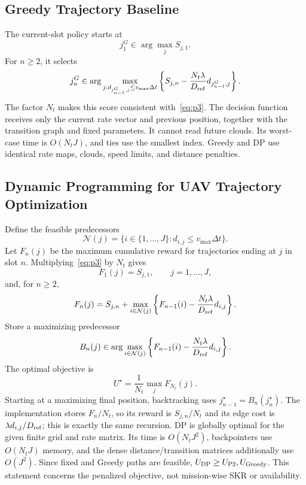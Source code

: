 \subsection{Greedy Trajectory Baseline}
The current-slot policy starts at
\begin{equation}
 j_1^G\in\arg\max_j S_{j,1}.
 \label{eq:greedy_init}
\end{equation}
For $n\ge2$, it selects
\begin{equation}
 j_n^G\in\arg\max_{j:d_{j_{n-1}^G,j}\le v_{\max}\Delta t}
 \left\{S_{j,n}-\frac{N_t\lambda}{D_{\rm ref}}d_{j_{n-1}^G,j}\right\}.
 \label{eq:greedy}
\end{equation}
The factor $N_t$ makes this score consistent with~\eqref{eq:p3}.
The decision function receives only the current rate vector and
previous position, together with the transition graph and fixed
parameters. It cannot read future clouds. Its worst-case time is
$O(N_tJ)$, and ties use the smallest index. Greedy and DP use identical
rate maps, clouds, speed limits, and distance penalties.

\subsection{Dynamic Programming for UAV Trajectory Optimization}
Define the feasible predecessors
\begin{equation}
 \mathcal N(j)=\{i\in\{1,\ldots,J\}:d_{i,j}\le v_{\max}\Delta t\}.
 \label{eq:neighbors}
\end{equation}
Let $F_n(j)$ be the maximum cumulative reward for trajectories ending
at $j$ in slot $n$. Multiplying~\eqref{eq:p3} by $N_t$ gives
\begin{equation}
 F_1(j)=S_{j,1},\qquad j=1,\ldots,J,
 \label{eq:dp_init}
\end{equation}
and, for $n\ge2$,
\begin{equation}
 F_n(j)=S_{j,n}+\max_{i\in\mathcal N(j)}
 \left\{F_{n-1}(i)-\frac{N_t\lambda}{D_{\rm ref}}d_{i,j}\right\}.
 \label{eq:dp}
\end{equation}
Store a maximizing predecessor
\begin{equation}
 B_n(j)\in\arg\max_{i\in\mathcal N(j)}
 \left\{F_{n-1}(i)-\frac{N_t\lambda}{D_{\rm ref}}d_{i,j}\right\}.
 \label{eq:backpointer}
\end{equation}
The optimal objective is
\begin{equation}
 U^\star=\frac{1}{N_t}\max_j F_{N_t}(j).
 \label{eq:terminal}
\end{equation}
Starting at a maximizing final position, backtracking uses
$j_{n-1}^\star=B_n(j_n^\star)$. The implementation stores $F_n/N_t$,
so its reward is $S_{j,n}/N_t$ and its edge cost is
$\lambda d_{i,j}/D_{\rm ref}$; this is exactly the same recursion.
DP is globally optimal for the given finite grid and rate matrix.
Its time is $O(N_tJ^2)$, backpointers use $O(N_tJ)$ memory, and
the dense distance/transition matrices additionally use $O(J^2)$.
Since fixed and Greedy paths are feasible,
$U_{\rm DP}\ge U_{\rm P2},U_{\rm Greedy}$. This statement concerns
the penalized objective, not mission-wise SKR or availability.

